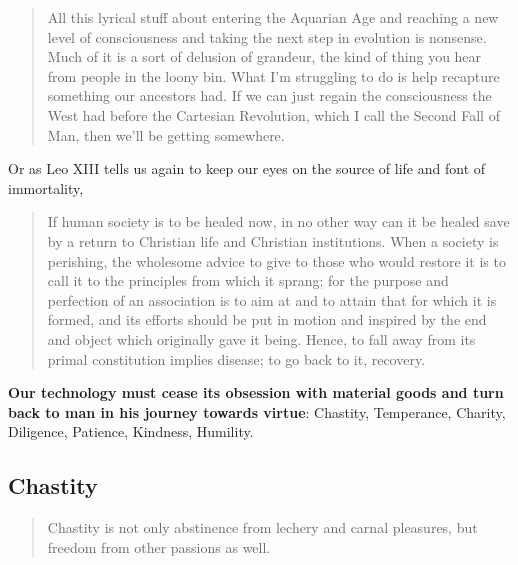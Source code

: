 \documentclass[letterpaper]{article}
\begin{document}
  \begin{quote}
    All this lyrical stuff about entering the Aquarian Age and reaching a new level of consciousness and taking the next step in evolution is nonsense. Much of it is a sort of delusion of grandeur, the kind of thing you hear from people in the loony bin. What I'm struggling to do is help recapture something our ancestors had. If we can just regain the consciousness the West had before the Cartesian Revolution, which I call the Second Fall of Man, then we'll be getting somewhere.

  \end{quote}

  Or as Leo XIII tells us again to keep our eyes on the source of life and font of immortality,

  \begin{quote}
    If human society is to be healed now, in no other way can it be healed save by a return to Christian life and Christian institutions. When a society is perishing, the wholesome advice to give to those who would restore it is to call it to the principles from which it sprang; for the purpose and perfection of an association is to aim at and to attain that for which it is formed, and its efforts should be put in motion and inspired by the end and object which originally gave it being. Hence, to fall away from its primal constitution implies disease; to go back to it, recovery.
  \end{quote}

  \textbf{Our technology must cease its obsession with material goods and turn back to man in his journey towards virtue}: Chastity, Temperance, Charity, Diligence, Patience, Kindness, Humility.

  \subsection{Chastity}

    \begin{quote}
      Chastity is not only abstinence from lechery and carnal pleasures, but freedom from other passions as well.
    \end{quote}
\end{document}
